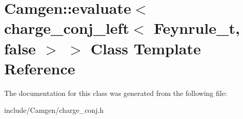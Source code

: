 \hypertarget{a00145}{\section{Camgen\-:\-:evaluate$<$ charge\-\_\-conj\-\_\-left$<$ Feynrule\-\_\-t, false $>$ $>$ Class Template Reference}
\label{a00145}
}


The documentation for this class was generated from the following file\-:\begin{DoxyCompactItemize}
\item 
include/\-Camgen/charge\-\_\-conj.\-h\end{DoxyCompactItemize}

